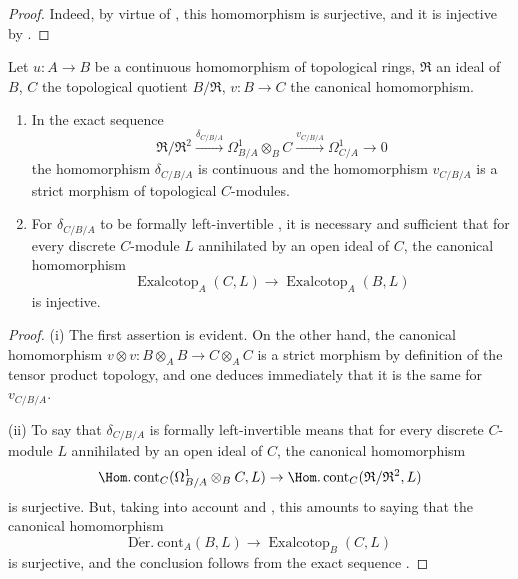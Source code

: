 \begin{proof}
Indeed, by virtue of , this homomorphism is surjective, and it is injective by .
\end{proof}

\begin{proposition}[20.7.8]
\label{0.20.7.8}
Let $u:A\to B$ be a continuous homomorphism of topological rings, $\mathfrak{R}$ an ideal of $B$, $C$ the topological quotient $B/\mathfrak{R}$, $v:B\to C$ the canonical homomorphism.
\begin{enumerate}
  \item[\rm(i)] In the exact sequence 
\[
  \mathfrak{R}/\mathfrak{R}^2\xrightarrow{\delta_{C/B/A}}\Omega^1_{B/A}\otimes_B C\xrightarrow{v_{C/B/A}}\Omega^1_{C/A}\to 0
\]
the homomorphism $\delta_{C/B/A}$ is continuous and the homomorphism $v_{C/B/A}$ is a strict morphism of topological $C$-modules.
  \item[\rm(ii)] For $\delta_{C/B/A}$ to be formally left-invertible , it is necessary and sufficient that for every discrete $C$-module $L$ annihilated by an open ideal of $C$, the canonical homomorphism
\begin{equation}
\tag{20.7.8.1}
  \label{0.20.7.8.1}
  \operatorname{Exalcotop}_A(C,L)\to\operatorname{Exalcotop}_A(B,L)
\end{equation}
is injective.
\end{enumerate}
\end{proposition}

\begin{proof}
(i) The first assertion is evident.
On the other hand, the canonical homomorphism $v\otimes v:B\otimes_A B\to C\otimes_A C$ is a strict morphism by definition of the tensor product topology, and one deduces immediately that it is the same for $v_{C/B/A}$.

(ii) To say that $\delta_{C/B/A}$ is formally left-invertible means that for every discrete $C$-module $L$ annihilated by an open ideal of $C$, the canonical homomorphism
\[
  \Hom.\operatorname{cont}_C(\Omega^1_{B/A}\otimes_B C,L)\to\Hom.\operatorname{cont}_C(\mathfrak{R}/\mathfrak{R}^2,L)
\]
is surjective.
But, taking into account  and , this amounts to saying that the canonical homomorphism
\[
  \operatorname{D\acute{e}r.\ cont}_A(B,L)\to\operatorname{Exalcotop}_B(C,L)
\]
is surjective, and the conclusion follows from the exact sequence .
\end{proof}

